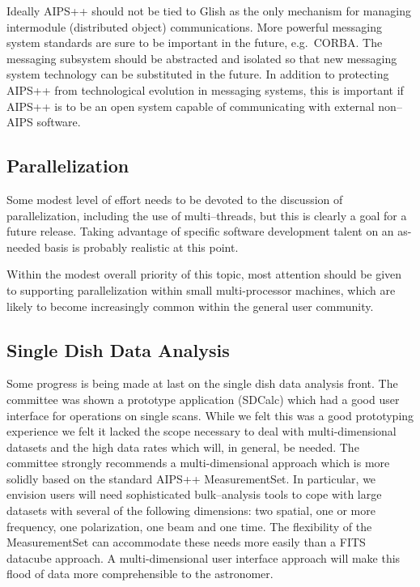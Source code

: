 Ideally AIPS++ should not be tied to Glish as the only mechanism for
managing intermodule (distributed object) communications.  More powerful
messaging system standards are sure to be important in the future, e.g.\ 
CORBA.  The messaging subsystem should be abstracted and isolated so that
new messaging system technology can be substituted in the future.  In
addition to protecting AIPS++ from technological evolution in messaging
systems, this is important if AIPS++ is to be an open system capable of
communicating with external non--AIPS software.

\subsection{Parallelization}

Some modest level of effort needs to be devoted to the discussion
of parallelization, including the use of multi--threads, but this is
clearly a goal for a future release. Taking advantage of specific
software development talent on an as-needed basis is probably
realistic at this point.  

Within the modest overall priority of this topic, most attention
should be given to supporting parallelization within small
multi-processor machines, which are likely to become increasingly
common within the general user community.

\subsection{Single Dish Data Analysis}

Some progress is being made at last on the single dish data analysis
front.  The committee was shown a prototype application (SDCalc) which
had a good user interface for operations on single scans.  While we
felt this was a good prototyping experience we felt it lacked the
scope necessary to deal with multi-dimensional datasets and the high
data rates which will, in general, be needed.  The committee strongly
recommends a multi-dimensional approach which is more solidly based on
the standard AIPS++ MeasurementSet.  In particular, we envision users
will need sophisticated bulk--analysis tools to cope with large
datasets with several of the following dimensions: two spatial, one or
more frequency, one polarization, one beam and one time.  The
flexibility of the MeasurementSet can accommodate these needs more
easily than a FITS datacube approach.  A multi-dimensional user
interface approach will make this flood of data more comprehensible to
the astronomer.

